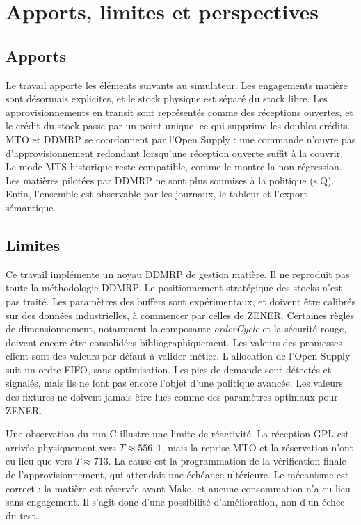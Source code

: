 \chapter{Apports, limites et perspectives}\label{ch:apports}

\section{Apports}

Le travail apporte les éléments suivants au simulateur. Les engagements matière sont
désormais explicites, et le stock physique est séparé du stock libre. Les approvisionnements en
transit sont représentés comme des réceptions ouvertes, et le crédit du stock passe par un point unique,
ce qui supprime les doubles crédits. MTO et DDMRP se coordonnent par l'Open Supply : une commande
n'ouvre pas d'approvisionnement redondant lorsqu'une réception ouverte suffit à la couvrir. Le mode
MTS historique reste compatible, comme le montre la non-régression. Les matières pilotées par DDMRP
ne sont plus soumises à la politique (s,Q). Enfin, l'ensemble est observable par les journaux, le
tableur et l'export sémantique.

\section{Limites}

Ce travail implémente un noyau DDMRP de gestion matière. Il ne reproduit pas toute la méthodologie
DDMRP. Le positionnement stratégique des stocks n'est pas traité. Les paramètres des buffers sont
expérimentaux, et doivent être calibrés sur des données industrielles, à commencer par celles de ZENER.
Certaines règles de dimensionnement, notamment la composante \emph{orderCycle} et la sécurité
rouge, doivent encore être consolidées bibliographiquement. Les valeurs des promesses client sont
des valeurs par défaut à valider métier. L'allocation de l'Open Supply suit un ordre FIFO, sans
optimisation. Les pics de demande sont détectés et signalés, mais ils ne font pas encore l'objet
d'une politique avancée. Les valeurs des fixtures ne doivent jamais être lues comme des paramètres
optimaux pour ZENER.

Une observation du run C illustre une limite de réactivité. La réception GPL est arrivée
physiquement vers $T \approx 556{,}1$, mais la reprise MTO et la réservation n'ont eu lieu que vers
$T \approx 713$. La cause est la programmation de la vérification finale de l'approvisionnement, qui
attendait une échéance ultérieure. Le mécanisme est correct : la matière est réservée avant Make, et
aucune consommation n'a eu lieu sans engagement. Il s'agit donc d'une possibilité d'amélioration, non d'un
échec du test.

